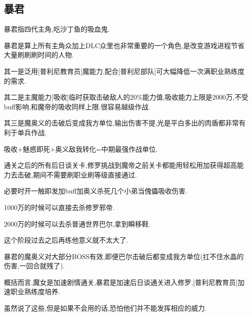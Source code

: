 	\newpage
	\subsection{暴君}

	暴君指四代主角,吃沙丁鱼的吸血鬼.

	暴君是算上所有主角众加上DLC众里也非常重要的一个角色,是改变游戏进程节省大量刷刷刷时间的人物.

	其一是泛用[普利尼教育员]魔能力,配合[普利尼部队]可大幅降低一次满职业熟练度的需求.

	其二是主魔能力[吸收]临时获取击破敌人的20\%能力值,吸收能力上限是2000万,不受buff影响,和魔帝的吸收同样上限.很容易越级作战.

	其三是魔奥义的击破后变成我方单位,输出伤害不提,光是平白多出的肉盾都非常有利于单兵作战.

	吸收+魅惑即死+奥义敌我转化=中期最强作战单位.

	通关之后的所有后日谈关卡,修罗挑战到魔帝之前关卡都能用轻松用{\color{red}{即死流}}加{\color{red}{暴君吸收}}获得超高能力去击破,期间不需要刷职业刷等级直接通过.

	必要时开一触即发加buff加奥义杀死几个小弟当傀儡吸收伤害.

	1000万的时候可以直接去杀修罗邪帝.

	2000万的时候可以去杀普通世界巴尔,拿到瞬移鞋.

	这个阶段过去之后再练他意义就不太大了.

	暴君的魔奥义对大部分BOSS有效,即便巴尔击破后都变成我方单位(扛不住水晶的伤害,一回合就残了).

	概括而言,魔女是加速剧情通关,暴君是加速后日谈通关进入修罗,[普利尼教育员]加速职业熟练度培养.

	虽然说了这些,但是如果不会用的话,恐怕他们并不能发挥相应的威力.

